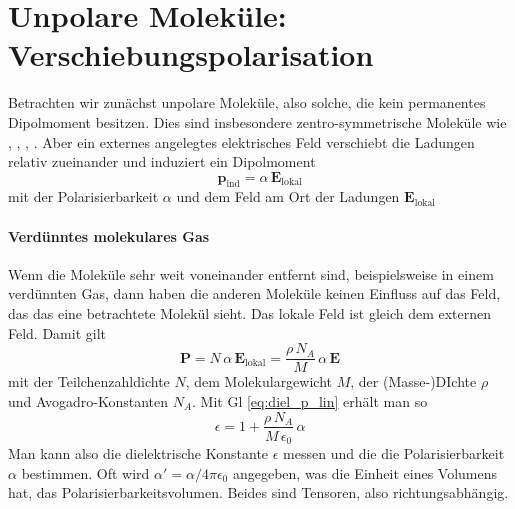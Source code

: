 %

\section{Unpolare Moleküle: Verschiebungspolarisation}

Betrachten wir zunächst unpolare Moleküle, also solche, die kein permanentes Dipolmoment  besitzen. Dies sind insbesondere zentro-symmetrische Moleküle wie , , , . Aber ein externes angelegtes elektrisches Feld verschiebt die Ladungen relativ zueinander und induziert ein Dipolmoment
\begin{equation}
 \mathbf{p}_\text{ind} = \alpha \, \mathbf{E}_\text{lokal}
\end{equation}
mit der Polarisierbarkeit $\alpha$ und dem Feld am Ort der Ladungen $\mathbf{E}_\text{lokal}$

\paragraph{Verdünntes molekulares Gas} Wenn die Moleküle sehr weit voneinander entfernt sind, beispielsweise in einem verdünnten Gas, dann haben die anderen Moleküle keinen Einfluss auf das Feld, das das eine betrachtete Molekül sieht. Das lokale Feld ist gleich dem externen Feld.
 Damit gilt
\begin{equation}
 \mathbf{P} = N \, \alpha \, \mathbf{E}_\text{lokal} =  \frac{\rho \, N_A } {M} \, \alpha \, \mathbf{E} \label{eq:diel_pind}
\end{equation}
mit der Teilchenzahldichte $N$, dem Molekulargewicht $M$, der (Masse-)DIchte $\rho$ und Avogadro-Konstanten $N_A$. Mit Gl \ref{eq:diel_p_lin} erhält man so
\begin{equation}
 \epsilon = 1 +  \frac{\rho \, N_A } {M \, \epsilon_0} \, \alpha  
\end{equation}
Man kann also die dielektrische Konstante $\epsilon$ messen und die die Polarisierbarkeit $\alpha$ bestimmen. Oft wird $\alpha' = \alpha / 4 \pi \epsilon_0$ angegeben, was die Einheit eines Volumens hat, das Polarisierbarkeitsvolumen. Beides sind Tensoren, also richtungsabhängig.

